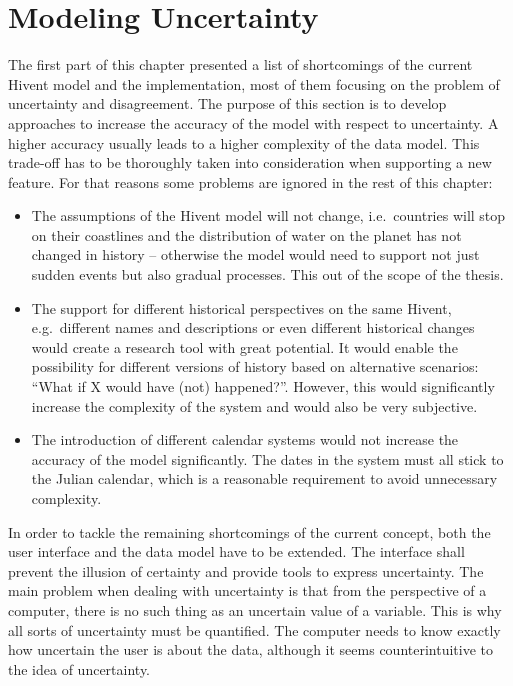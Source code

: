 \section{Modeling Uncertainty} %
\label{sec:modelling_uncertainty}

The first part of this chapter presented a list of shortcomings of the current Hivent model and the implementation, most of them focusing on the problem of uncertainty and disagreement. The purpose of this section is to develop approaches to increase the accuracy of the model with respect to uncertainty. A higher accuracy usually leads to a higher complexity of the data model. This trade-off has to be thoroughly taken into consideration when supporting a new feature. For that reasons some problems are ignored in the rest of this chapter:

\begin{itemize}
  \item The assumptions of the Hivent model will not change, i.e.\ countries will stop on their coastlines and the distribution of water on the planet has not changed in history -- otherwise the model would need to support not just sudden events but also gradual processes. This out of the scope of the thesis.
  \item The support for different historical perspectives on the same Hivent, e.g.\ different names and descriptions or even different historical changes would create a research tool with great potential. It would enable the possibility for different versions of history based on alternative scenarios: ``What if X would have (not) happened?''. However, this would significantly increase the complexity of the system and would also be very subjective.
  \item The introduction of different calendar systems would not increase the accuracy of the model significantly. The dates in the system must all stick to the Julian calendar, which is a reasonable requirement to avoid unnecessary complexity.
\end{itemize}

In order to tackle the remaining shortcomings of the current concept, both the user interface and the data model have to be extended. The interface shall prevent the illusion of certainty and provide tools to express uncertainty. The main problem when dealing with uncertainty is that from the perspective of a computer, there is no such thing as an uncertain value of a variable. This is why all sorts of uncertainty must be quantified. The computer needs to know exactly how uncertain the user is about the data, although it seems counterintuitive to the idea of uncertainty.

